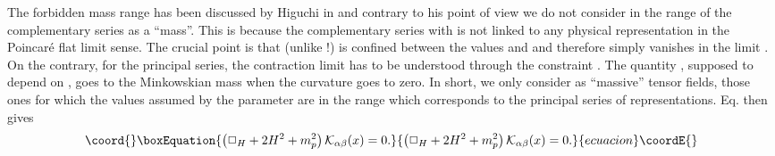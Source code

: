 \documentclass[a4paper,11pt,showpacs,preprintnumbers]{revtex4}
\begin{document}
The forbidden mass range has been discussed by Higuchi in
\cite{higu2} and contrary to his point of view we do not consider
\coordHE{} in the range of  the complementary series as a ``mass''.
This is because the complementary series with \coordHE{}  is not linked
to any physical representation in the Poincar\'e flat limit sense.
The crucial point is that \coordHE{} (unlike \coordHE{} !) is
confined between the values \coordHE{} and \coordHE{} and therefore simply
vanishes in the limit \coordHE{}. On the contrary, for the principal
series, the contraction limit has to be understood through the
constraint \coordHE{}. The quantity \coordHE{}, supposed to depend on
\coordHE{}, goes to the Minkowskian mass \coordHE{} when the curvature goes to
zero. In short, we only consider as ``massive'' tensor fields,
those ones for which the values assumed by the parameter \coordHE{} are
in the range \coordHE{} which corresponds to the principal series of
representations. Eq. \myHighlight{$(\ref{eq:wave})$}\coordHE{} then gives
\begin{equation}\coord{}\boxEquation{
\left(\Box_H+2H^2+m^2_p\right){\cal K}_{\alpha\beta}(x)=0.
}{
\left(\Box_H+2H^2+m^2_p\right){\cal K}_{\alpha\beta}(x)=0.
}{ecuacion}\coordE{}\end{equation}
\end{document}
